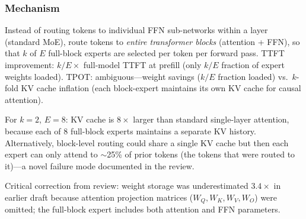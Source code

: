 \documentclass[11pt]{article}
\begin{document}
\subsubsection*{Mechanism}
Instead of routing tokens to individual FFN sub-networks within a layer (standard MoE), route tokens to \emph{entire transformer blocks} (attention + FFN), so that $k$ of $E$ full-block experts are selected per token per forward pass.
TTFT improvement: $k/E \times$ full-model TTFT at prefill (only $k/E$ fraction of expert weights loaded).
TPOT: ambiguous---weight savings ($k/E$ fraction loaded) vs.\ $k$-fold KV cache inflation (each block-expert maintains its own KV cache for causal attention).

For $k=2$, $E=8$: KV cache is $8\times$ larger than standard single-layer attention, because each of 8 full-block experts maintains a separate KV history.
Alternatively, block-level routing could share a single KV cache but then each expert can only attend to $\sim$25\% of prior tokens (the tokens that were routed to it)---a novel failure mode documented in the review.

Critical correction from review: weight storage was underestimated $3.4\times$ in earlier draft because attention projection matrices ($W_Q, W_K, W_V, W_O$) were omitted; the full-block expert includes both attention and FFN parameters.
\end{document}
